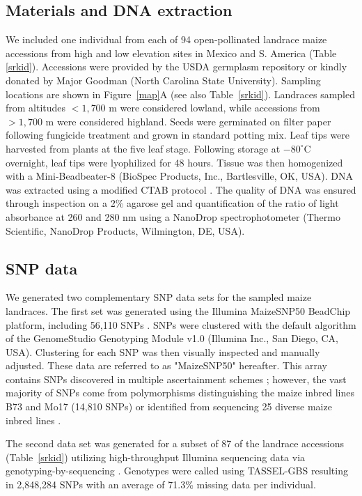 \subsection*{Materials and DNA extraction}
We included one individual from each of 94 open-pollinated landrace maize accessions from high and low elevation sites in Mexico and S. America (Table \ref{srkid}).   
Accessions were provided by the USDA germplasm repository or kindly donated by Major Goodman (North Carolina State University).  
Sampling locations are shown in Figure~\ref{map}A (see also Table~\ref{srkid}).  
Landraces sampled from altitudes $<1,700$ m were considered lowland, while accessions from $>1,700$ m were considered highland.  
Seeds were germinated on filter paper following fungicide treatment and grown in standard potting mix.  
Leaf tips were harvested from plants at the five leaf stage.  
Following storage at $-80^{\circ}$C overnight, leaf tips were lyophilized for 48 hours.  
Tissue was then homogenized with a Mini-Beadbeater-8 (BioSpec Products, Inc., Bartlesville, OK, USA).  
DNA was extracted using a modified CTAB protocol \cite[]{CTAB}.  
The quality of DNA was ensured through inspection on a 2\% agarose gel and quantification of the ratio of light absorbance at 260 and 280 nm using a NanoDrop spectrophotometer (Thermo Scientific, NanoDrop Products, Wilmington, DE, USA).

\subsection*{SNP data}
We generated two complementary SNP data sets for the sampled maize landraces. 
The first set was generated using the Illumina MaizeSNP50 BeadChip platform, including 56,110 SNPs \cite[]{Ganal_2011_22174790}.  
SNPs were clustered with the default algorithm of the GenomeStudio Genotyping Module v1.0 (Illumina Inc., San Diego, CA, USA).   
Clustering for each SNP was then visually inspected and manually adjusted.  
These data are referred to as "MaizeSNP50" hereafter.  
This array contains SNPs discovered in multiple ascertainment schemes \cite[]{Ganal_2011_22174790}; however, the vast majority of SNPs come from polymorphisms distinguishing the maize inbred lines B73 and Mo17 (14,810 SNPs) or identified from sequencing 25 diverse maize inbred lines \cite[40,594 SNPs;][]{Gore20112009}.  

The second data set was generated for a subset of 87 of the landrace accessions (Table~\ref{srkid}) utilizing high-throughput Illumina sequencing data via genotyping-by-sequencing \cite[GBS;][]{Elshire2011}.
Genotypes were called using TASSEL-GBS \cite[]{Glaubitz_GBS} resulting in 2,848,284 SNPs with an average of 71.3\% missing data per individual.

